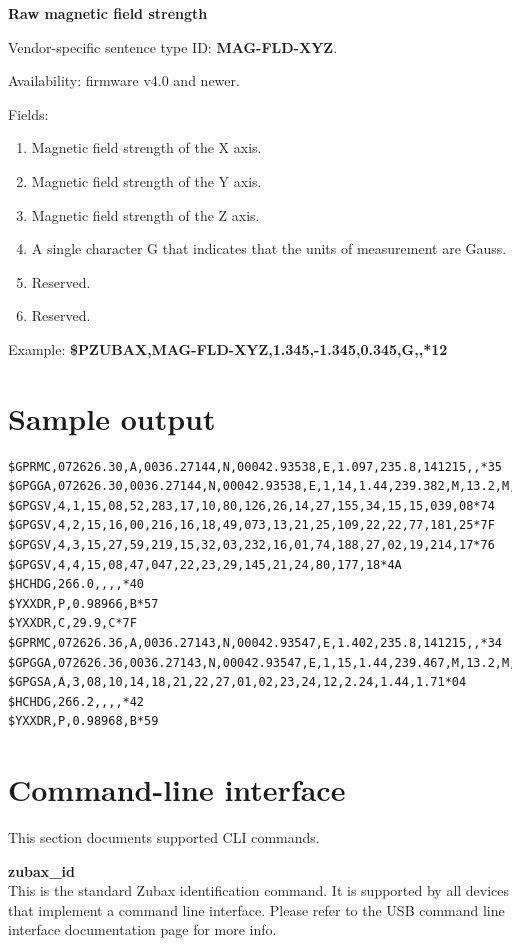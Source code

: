 \documentclass{zubaxdoc}
\begin{document}
\textbf{Raw magnetic field strength}

Vendor-specific sentence type ID: \textbf{MAG-FLD-XYZ}.

Availability: firmware v4.0 and newer.

Fields: 
\begin{enumerate}
\item Magnetic field strength of the X axis.
\item Magnetic field strength of the Y axis.
\item Magnetic field strength of the Z axis.
\item A single character G that indicates that the units of measurement are Gauss.
\item Reserved.
\item Reserved.
\end{enumerate}
Example: \textbf{{\$}PZUBAX,MAG-FLD-XYZ,1.345,-1.345,0.345,G,,*12}

\section{Sample output}
\begin{verbatim}
$GPRMC,072626.30,A,0036.27144,N,00042.93538,E,1.097,235.8,141215,,*35
$GPGGA,072626.30,0036.27144,N,00042.93538,E,1,14,1.44,239.382,M,13.2,M,,*5E
$GPGSV,4,1,15,08,52,283,17,10,80,126,26,14,27,155,34,15,15,039,08*74
$GPGSV,4,2,15,16,00,216,16,18,49,073,13,21,25,109,22,22,77,181,25*7F
$GPGSV,4,3,15,27,59,219,15,32,03,232,16,01,74,188,27,02,19,214,17*76
$GPGSV,4,4,15,08,47,047,22,23,29,145,21,24,80,177,18*4A
$HCHDG,266.0,,,,*40
$YXXDR,P,0.98966,B*57
$YXXDR,C,29.9,C*7F
$GPRMC,072626.36,A,0036.27143,N,00042.93547,E,1.402,235.8,141215,,*34
$GPGGA,072626.36,0036.27143,N,00042.93547,E,1,15,1.44,239.467,M,13.2,M,,*5A
$GPGSA,A,3,08,10,14,18,21,22,27,01,02,23,24,12,2.24,1.44,1.71*04
$HCHDG,266.2,,,,*42
$YXXDR,P,0.98968,B*59
\end{verbatim}
\clearpage
\section{Command-line interface}

This section documents supported CLI commands.

\textbf{zubax{\_}id}\\
This is the standard Zubax identification command. It is supported by all devices that implement a command line interface. Please refer to the USB command line interface documentation page for more info.
\end{document}

